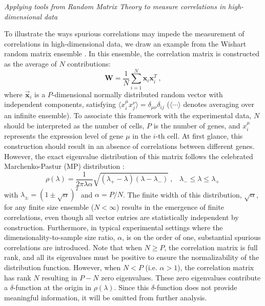 \documentclass[12pt]{article}
\begin{document}
\vspace{0.5cm}
\newline
\textit{Applying tools from Random Matrix Theory to measure correlations in high-dimensional data}\par
To illustrate the ways spurious correlations may impede the measurement of correlations in high-dimensional data, we draw an example from the Wishart random matrix ensemble \cite{Wishart1928}. In this ensemble, the correlation matrix is constructed as the average of $N$ contributions:
\begin{equation}
  \mathbf{W}=\frac{1}{N}\sum_{i=1}^N{\mathbf{x}_i\mathbf{x}_i^T}\ ,
\end{equation}
where $\vec{\mathbf{x}}_i$ is a $P$-dimensional normally distributed random vector with independent components, satisfying 
$\langle{x_i^{\mu}x_j^{\nu}}\rangle=\delta_{\mu\nu}\delta_{ij}$ ($\langle\cdots\rangle$ denotes averaging over an infinite ensemble). To associate this framework with the experimental data, $N$ should be interpreted as the number of cells, $P$ is the number of genes, and $x_i^{\mu}$ represents the expression level of gene $\mu$ in the $i$-th cell. At first glance, this construction should result in an absence of correlations between different genes. However, the exact eigenvalue distribution of this matrix follows the celebrated Marchenko-Pastur (MP) distribution \cite{Marchenko_Pastur}:
\begin{equation}
    \rho(\lambda)=\frac{1}{2\pi\lambda\alpha}\sqrt{(\lambda_{+}-\lambda)(\lambda-\lambda_{-})} \ , \hspace{10pt}\lambda_-\leq\lambda\leq\lambda_+ \,
\end{equation}
with $\lambda_{\pm}=(1\pm\sqrt{\alpha})^2$ and $\alpha=P/N$. The finite width of this distribution, $\sqrt{\alpha}$, for any finite size ensemble ($N<\infty$) results in the emergence of finite correlations, even though all vector entries are statistically independent by construction. Furthermore, in typical experimental settings where the dimensionality-to-sample size ratio, $\alpha$, is on the order of one, substantial spurious correlations are introduced. Note that when $N\geq P$, the correlation matrix is full rank, and all its eigenvalues must be positive to ensure the normalizability of the distribution function. However, when $N<P$ (i.e. $\alpha>1$), the correlation matrix has rank $N$ resulting in $P-N$ zero eigenvalues.
These zero eigenvalues contribute a $\delta$-function at the origin in $\rho(\lambda)$.
Since this $\delta$-function does not provide meaningful information, it will be omitted from further analysis.\par
\end{document}
